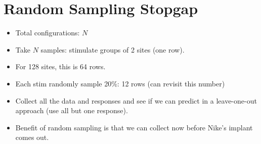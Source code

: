 \documentclass[11pt,letterpaper]{article} %
\begin{document}
\clearpage
\section*{Random Sampling Stopgap}

\begin{itemize}
    \item Total configurations: $N$
    \item Take $N$ samples: stimulate groups of 2 sites (one row). 
    \item For 128 sites, this is 64 rows. 
    \item Each stim randomly sample 20\%: 12 rows (can revisit this number)
    \item Collect all the data and responses and see if we can predict in a leave-one-out approach (use all but one response). 
    \item Benefit of random sampling is that we can collect now before Nike's implant comes out.
\end{itemize}

\vspace{-1cm}
\end{document}
